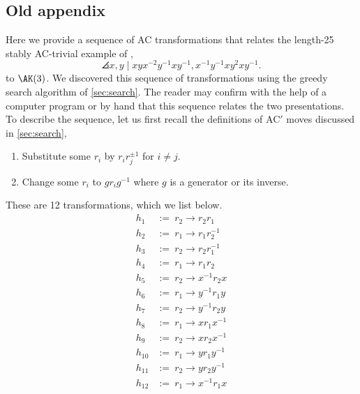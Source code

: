 \subsection{Old appendix}

Here we provide a sequence of AC transformations that relates the length-25 stably AC-trivial example of \cite{MMS},
\[
\angles{x, y \mid xyx^{-2}y^{-1} xy^{-1}, x^{-1} y^{-1} x y^2 x y^{-1}}.
\]
to $\AK(3)$. We discovered this sequence of transformations using the greedy search algorithm of \autoref{sec:search}. The reader may confirm with the help of a computer program or by hand that this sequence relates the two presentations. To describe the sequence, let us first recall the definitions of AC$'$ moves discussed in \autoref{sec:search},
\begin{enumerate}[label=(AC$'$\arabic*)]
	\item Substitute some $r_i$ by $r_i r_j^{\pm 1}$ for $i \neq j$.
	\item Change some $r_i$ to $g r_i g^{-1}$ where $g$ is a generator or its inverse.
\end{enumerate}

These are 12 transformations, which we list below.
\[
\begin{aligned}
h_1 &:= \  r_2 \rightarrow r_2 r_1 \\
h_2 &:= \ r_1 \rightarrow r_1 r_2^{-1} \\
h_3 &:= \ r_2 \rightarrow r_2 r_1^{-1} \\
h_4 &:= \ r_1 \rightarrow r_1 r_2 \\
h_5 &:= \ r_2 \rightarrow x^{-1} r_2 x \\
h_6 &:= \ r_1 \rightarrow y^{-1} r_1 y \\
h_7 &:= \ r_2 \rightarrow y^{-1} r_2 y \\
h_8 &:= \ r_1 \rightarrow x r_1 x^{-1} \\
h_9 &:= \ r_2 \rightarrow x r_2 x^{-1} \\
h_{10} &:= \ r_1 \rightarrow y r_1 y^{-1} \\
h_{11} &:= \ r_2 \rightarrow y r_2 y^{-1} \\
h_{12} &:= \ r_1 \rightarrow x^{-1} r_1 x
\end{aligned}
\]

